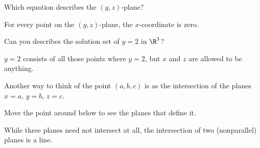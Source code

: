\documentclass{ximera}
\begin{document}
\begin{question}
  Which equation describes the $(y,z)$-plane?
  \begin{prompt}
  \begin{multipleChoice}
  \end{multipleChoice}
  \begin{hint}
    For every point on the $(y,z)$-plane, the $x$-coordinate is zero.
  \end{hint}
  \end{prompt}
\end{question}

\begin{question}
  Can you describes the solution set of $y=2$ in $\R^3$?
  \begin{prompt}
  \begin{multipleChoice}
  \end{multipleChoice}
  \begin{hint}
    $y=2$ consists of all those points where $y=2$, but $x$ and
    $z$ are allowed to be anything.  
  \end{hint}
  \end{prompt}
\end{question}


Another way to think of the point $(a,b,c)$ is as the intersection of
the planes $x=a$, $y=b$, $z=c$.

\begin{onlineOnly}
  Move the point around below to see the planes that define it.

  \begin{center}
  \end{center}
\end{onlineOnly}


While three planes need not intersect at all, the intersection of two
(nonparallel) planes is a line.
\end{document}
